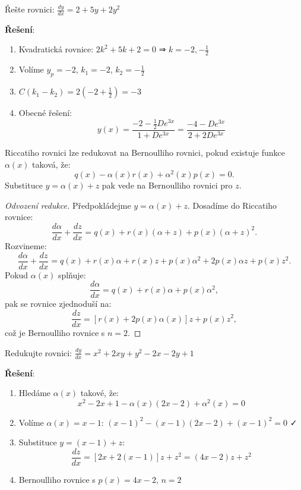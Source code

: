 \vspace{0.6\baselineskip}

\begin{example}
\label{ex:konstantni-koeficienty-aplikace}
Řešte rovnici: $\frac{dy}{dx} = 2 + 5y + 2y^2$

\textbf{Řešení}:
\begin{enumerate}
\item Kvadratická rovnice: $2k^2 + 5k + 2 = 0$ ⇒ $k = -2, -\frac{1}{2}$
\item Volíme $y_p = -2$, $k_1 = -2$, $k_2 = -\frac{1}{2}$
\item $C(k_1 - k_2) = 2(-2 + \frac{1}{2}) = -3$
\item Obecné řešení:
\[
y(x) = \frac{-2 - \frac{1}{2}De^{3x}}{1 + De^{3x}} = \frac{-4 - De^{3x}}{2 + 2De^{3x}}
\]
\end{enumerate}
\end{example}

\vspace{0.8\baselineskip}

\begin{method}
\label{met:redukce-bernoulliho}
Riccatiho rovnici lze redukovat na Bernoulliho rovnici, pokud existuje funkce $\alpha(x)$ taková, že:
\[
q(x) - \alpha(x)r(x) + \alpha^2(x)p(x) = 0.
\]
Substituce $y = \alpha(x) + z$ pak vede na Bernoulliho rovnici pro $z$.
\end{method}

\vspace{0.6\baselineskip}

\begin{proof}[Odvození redukce]
Předpokládejme $y = \alpha(x) + z$. Dosadíme do Riccatiho rovnice:
\[
\frac{d\alpha}{dx} + \frac{dz}{dx} = q(x) + r(x)(\alpha + z) + p(x)(\alpha + z)^2.
\]
Rozvineme:
\[
\frac{d\alpha}{dx} + \frac{dz}{dx} = q(x) + r(x)\alpha + r(x)z + p(x)\alpha^2 + 2p(x)\alpha z + p(x)z^2.
\]
Pokud $\alpha(x)$ splňuje:
\[
\frac{d\alpha}{dx} = q(x) + r(x)\alpha + p(x)\alpha^2,
\]
pak se rovnice zjednoduší na:
\[
\frac{dz}{dx} = [r(x) + 2p(x)\alpha(x)]z + p(x)z^2,
\]
což je Bernoulliho rovnice s $n = 2$.
\end{proof}

\vspace{0.6\baselineskip}

\begin{example}
\label{ex:redukce-bernoulli-priklad}
Redukujte rovnici: $\frac{dy}{dx} = x^2 + 2xy + y^2 - 2x - 2y + 1$

\textbf{Řešení}:
\begin{enumerate}
\item Hledáme $\alpha(x)$ takové, že:
\[
x^2 - 2x + 1 - \alpha(x)(2x - 2) + \alpha^2(x) = 0
\]
\item Volíme $\alpha(x) = x - 1$: $(x-1)^2 - (x-1)(2x-2) + (x-1)^2 = 0$ ✓
\item Substituce $y = (x-1) + z$:
\[
\frac{dz}{dx} = [2x + 2(x-1)]z + z^2 = (4x - 2)z + z^2
\]
\item Bernoulliho rovnice s $p(x) = 4x - 2$, $n = 2$
\end{enumerate}
\end{example}

